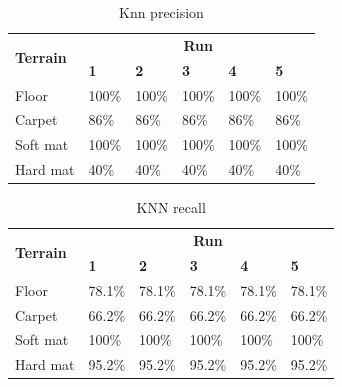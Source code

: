 \documentclass[USenglish]{ifimaster}  %
\begin{document}
	\begin{table}[h]
		\centering
		\begin{tabular}{@{}llllll@{}}
			\toprule
			\multirow{2}{*}{\textbf{Terrain}} & \multicolumn{5}{c}{\textbf{Run}} \\ \cmidrule(l){2-6} 
			& \multicolumn{1}{l|}{\textbf{1}} & \multicolumn{1}{l|}{\textbf{2}} & \multicolumn{1}{l|}{\textbf{3}} & \multicolumn{1}{l|}{\textbf{4}} & \textbf{5} \\ \midrule
			\multicolumn{1}{l|}{Floor} & \multicolumn{1}{l|}{100\%} & \multicolumn{1}{l|}{100\%} & \multicolumn{1}{l|}{100\%} & \multicolumn{1}{l|}{100\%} & 100\% \\ \midrule
			\multicolumn{1}{l|}{Carpet} & \multicolumn{1}{l|}{86\%} & \multicolumn{1}{l|}{86\%} & \multicolumn{1}{l|}{86\%} & \multicolumn{1}{l|}{86\%} & 86\% \\ \midrule
			\multicolumn{1}{l|}{Soft mat} & \multicolumn{1}{l|}{100\%} & \multicolumn{1}{l|}{100\%} & \multicolumn{1}{l|}{100\%} & \multicolumn{1}{l|}{100\%} & 100\% \\ \midrule
			\multicolumn{1}{l|}{Hard mat} & \multicolumn{1}{l|}{40\%} & \multicolumn{1}{l|}{40\%} & \multicolumn{1}{l|}{40\%} & \multicolumn{1}{l|}{40\%} & 40\% \\ \bottomrule
		\end{tabular}
		\caption{Knn precision}
		\label{precisionKNN}
	\end{table}
	\FloatBarrier
	
	\begin{table}[h]
		\centering
		\begin{tabular}{@{}llllll@{}}
			\toprule
			\multirow{2}{*}{\textbf{Terrain}} & \multicolumn{5}{c}{\textbf{Run}} \\ \cmidrule(l){2-6} 
			& \multicolumn{1}{l|}{\textbf{1}} & \multicolumn{1}{l|}{\textbf{2}} & \multicolumn{1}{l|}{\textbf{3}} & \multicolumn{1}{l|}{\textbf{4}} & \textbf{5} \\ \midrule
			\multicolumn{1}{l|}{Floor} & \multicolumn{1}{l|}{78.1\%} & \multicolumn{1}{l|}{78.1\%} & \multicolumn{1}{l|}{78.1\%} & \multicolumn{1}{l|}{78.1\%} & 78.1\% \\ \midrule
			\multicolumn{1}{l|}{Carpet} & \multicolumn{1}{l|}{66.2\%} & \multicolumn{1}{l|}{66.2\%} & \multicolumn{1}{l|}{66.2\%} & \multicolumn{1}{l|}{66.2\%} & 66.2\% \\ \midrule
			\multicolumn{1}{l|}{Soft mat} & \multicolumn{1}{l|}{100\%} & \multicolumn{1}{l|}{100\%} & \multicolumn{1}{l|}{100\%} & \multicolumn{1}{l|}{100\%} & 100\% \\ \midrule
			\multicolumn{1}{l|}{Hard mat} & \multicolumn{1}{l|}{95.2\%} & \multicolumn{1}{l|}{95.2\%} & \multicolumn{1}{l|}{95.2\%} & \multicolumn{1}{l|}{95.2\%} & 95.2\% \\ \bottomrule
		\end{tabular}
		\caption{KNN recall}
		\label{knnrecall}
	\end{table}
	\FloatBarrier
	
\end{document}
